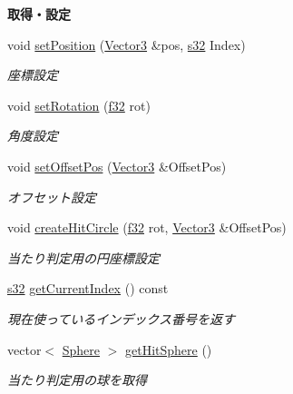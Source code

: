 \begin{Indent}{\bf 取得・設定}\par
\begin{DoxyCompactItemize}
\item 
void \hyperlink{class_castle_wall_ab956a7d5de1bc8096cd2ee5ca51d247a}{set\-Position} (\hyperlink{struct_vector3}{Vector3} \&pos, \hyperlink{_main_8h_a0ce6887c26c1c49ad3be5710dd42bfd6}{s32} Index)
\begin{DoxyCompactList}\small\item\em 座標設定 \end{DoxyCompactList}\item 
void \hyperlink{class_castle_wall_ade42438c205cfd2300b81ac2b93148e7}{set\-Rotation} (\hyperlink{_main_8h_a5f6906312a689f27d70e9d086649d3fd}{f32} rot)
\begin{DoxyCompactList}\small\item\em 角度設定 \end{DoxyCompactList}\item 
void \hyperlink{class_castle_wall_a0406094707c257c297436da3ac4f5773}{set\-Offset\-Pos} (\hyperlink{struct_vector3}{Vector3} \&Offset\-Pos)
\begin{DoxyCompactList}\small\item\em オフセット設定 \end{DoxyCompactList}\item 
void \hyperlink{class_castle_wall_ae2e2dae12c7a59a0408eeb41bc903fbd}{create\-Hit\-Circle} (\hyperlink{_main_8h_a5f6906312a689f27d70e9d086649d3fd}{f32} rot, \hyperlink{struct_vector3}{Vector3} \&Offset\-Pos)
\begin{DoxyCompactList}\small\item\em 当たり判定用の円座標設定 \end{DoxyCompactList}\item 
\hyperlink{_main_8h_a0ce6887c26c1c49ad3be5710dd42bfd6}{s32} \hyperlink{class_castle_wall_af9fa2a0111a758685746a8f34f3c60f1}{get\-Current\-Index} () const 
\begin{DoxyCompactList}\small\item\em 現在使っているインデックス番号を返す \end{DoxyCompactList}\item 
vector$<$ \hyperlink{struct_sphere}{Sphere} $>$ \hyperlink{class_castle_wall_a92371447e50d7e4554ae1ec395032001}{get\-Hit\-Sphere} ()
\begin{DoxyCompactList}\small\item\em 当たり判定用の球を取得 \end{DoxyCompactList}\end{DoxyCompactItemize}
\end{Indent}
